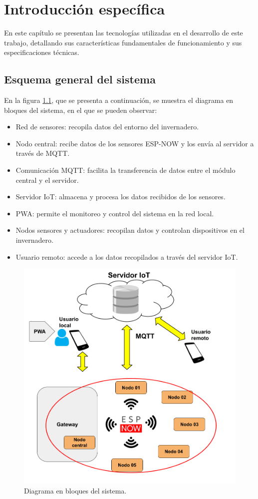 \chapter{Introducción específica} %

\label{Chapter2}

En este capítulo se presentan las tecnologías utilizadas en el desarrollo de este trabajo, detallando sus características fundamentales de funcionamiento y sus especificaciones técnicas.

\section{Esquema general del sistema}

En la figura \ref{fig:diagBloques}, que se presenta a continuación, se muestra el diagrama en bloques del sistema, en el que se pueden observar:

\begin{itemize}
	\item Red de sensores: recopila datos del entorno del invernadero.
	\item Nodo central: recibe datos de los sensores ESP-NOW y los envía al servidor a través de MQTT.
	\item Comunicación MQTT: facilita la transferencia de datos entre el módulo central y el servidor.
	\item Servidor IoT: almacena y procesa los datos recibidos de los sensores.
	\item PWA: permite el monitoreo y control del sistema en la red local.
	\item Nodos sensores y actuadores: recopilan datos y controlan dispositivos en el invernadero.
	\item Usuario remoto: accede a los datos recopilados a través del servidor IoT.
\end{itemize}

\begin{figure}[H]
\centering 
\includegraphics[width=.5\textwidth]{./Figures/Diagrama_bloques.png}
\caption{Diagrama en bloques del sistema.}
\label{fig:diagBloques}
\end{figure}



